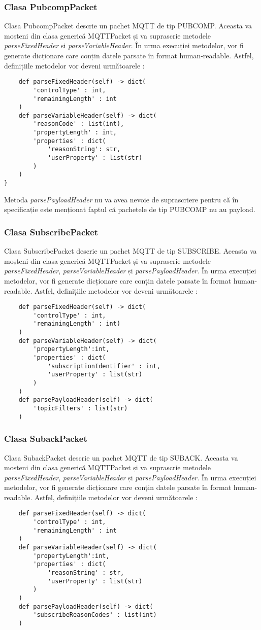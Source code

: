 \documentclass{report}
\begin{document}
\subsubsection{Clasa PubcompPacket}
Clasa PubcompPacket descrie un pachet MQTT de tip PUBCOMP. Aceasta va moșteni din clasa generică MQTTPacket și va suprascrie metodele \emph{parseFixedHeader} si \emph{parseVariableHeader}.
În urma execuției metodelor, vor fi generate dicționare care conțin datele parsate în format human-readable.
Astfel, definițiile metodelor vor deveni următoarele : 
\\
\begin{verbatim}
	def parseFixedHeader(self) -> dict(
		'controlType' : int, 
		'remainingLength' : int
	)
	def parseVariableHeader(self) -> dict(
		'reasonCode' : list(int),
		'propertyLength' : int, 	
		'properties' : dict(
			'reasonString': str, 
			'userProperty' : list(str)
		)
	)
}
\end{verbatim}
Metoda \emph{parsePayloadHeader} nu va avea nevoie de suprascriere pentru că în specificație este menționat faptul că pachetele de tip PUBCOMP nu au payload.
\subsubsection{Clasa SubscribePacket}
Clasa SubscribePacket descrie un pachet MQTT de tip SUBSCRIBE. Aceasta va moșteni din clasa generică MQTTPacket și va suprascrie metodele \emph{parseFixedHeader}, \emph{parseVariableHeader} și \emph{parsePayloadHeader}.
În urma execuției metodelor, vor fi generate dicționare care conțin datele parsate în format human-readable.
Astfel, definițiile metodelor vor deveni următoarele : 
\\
\begin{verbatim}
	def parseFixedHeader(self) -> dict(
		'controlType' : int, 
		'remainingLength' : int)
	)
	def parseVariableHeader(self) -> dict(
		'propertyLength':int,
		'properties' : dict(
			'subscriptionIdentifier' : int, 
			'userProperty' : list(str)
		)
	)
	def parsePayloadHeader(self) -> dict(
		'topicFilters' : list(str)
	)
\end{verbatim}
\subsubsection{Clasa SubackPacket}
Clasa SubackPacket descrie un pachet MQTT de tip SUBACK. Aceasta va moșteni din clasa generică MQTTPacket și va suprascrie metodele \emph{parseFixedHeader}, \emph{parseVariableHeader} și \emph{parsePayloadHeader}.
În urma execuției metodelor, vor fi generate dicționare care conțin datele parsate în format human-readable.
Astfel, definițiile metodelor vor deveni următoarele : 
\\
\begin{verbatim}
	def parseFixedHeader(self) -> dict(
		'controlType' : int, 
		'remainingLength' : int
	)
	def parseVariableHeader(self) -> dict(
		'propertyLength':int,
		'properties' : dict(
			'reasonString' : str, 
			'userProperty' : list(str)
		)
	)
	def parsePayloadHeader(self) -> dict(
		'subscribeReasonCodes' : list(int)
	)
\end{verbatim}
\end{document}
